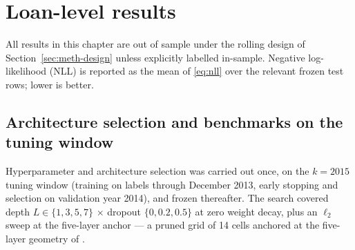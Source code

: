 
\chapter{Loan-level results}
\label{chap:loanlevel}

All results in this chapter are out of sample under the rolling
design of Section~\ref{sec:meth-design} unless explicitly labelled
in-sample.  Negative log-likelihood (NLL) is reported as the mean of
\eqref{eq:nll} over the relevant frozen test rows; lower is better.

\section{Architecture selection and benchmarks on the tuning window}
\label{sec:results-tuning}

Hyperparameter and architecture selection was carried out once, on
the $k{=}2015$ tuning window (training on labels through December
2013, early stopping and selection on validation year 2014), and
frozen thereafter.  The search covered depth
$L\in\{1,3,5,7\}$ $\times$ dropout $\{0, 0.2, 0.5\}$ at zero weight
decay, plus an $\ell_2$ sweep at the five-layer anchor --- a
pruned grid of 14 cells anchored at the five-layer geometry of
\citet{sirignano2021}.

\begin{table}[htbp]\centering\small
\caption[Tuning-window architecture comparison (analogue of
\citealp{sirignano2021} Table 11)]{Tuning-window comparison (the
analogue of Table 11 in \citealp{sirignano2021}): in- and
out-of-sample NLL on the $k{=}2015$ window (dev export) for the
empirical matrix, bucketed matrix, multinomial logit, augmented logit,
neural networks of depth 1/3/5/7, the selected configuration with
dropout, and the eight-network ensemble.  Frequency benchmarks and the
augmented logit carry no in-sample column.}\label{tab:tablea}

\end{table}

